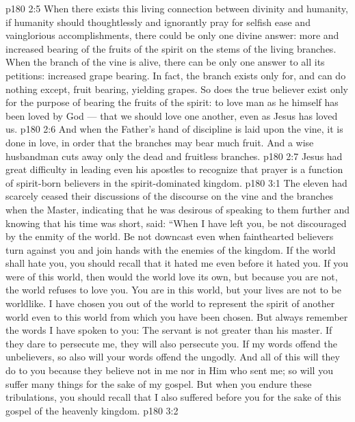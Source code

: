 \vs p180 2:5 When there exists this living connection between divinity and humanity, if humanity should thoughtlessly and ignorantly pray for selfish ease and vainglorious accomplishments, there could be only one divine answer: more and increased bearing of the fruits of the spirit on the stems of the living branches. When the branch of the vine is alive, there can be only one answer to all its petitions: increased grape bearing. In fact, the branch exists only for, and can do nothing except, fruit bearing, yielding grapes. So does the true believer exist only for the purpose of bearing the fruits of the spirit: to love man as he himself has been loved by God --- that we should love one another, even as Jesus has loved us.
\vs p180 2:6 And when the Father’s hand of discipline is laid upon the vine, it is done in love, in order that the branches may bear much fruit. And a wise husbandman cuts away only the dead and fruitless branches.
\vs p180 2:7 Jesus had great difficulty in leading even his apostles to recognize that prayer is a function of spirit\hyp{}born believers in the spirit\hyp{}dominated kingdom.
\vs p180 3:1 The eleven had scarcely ceased their discussions of the discourse on the vine and the branches when the Master, indicating that he was desirous of speaking to them further and knowing that his time was short, said: “When I have left you, be not discouraged by the enmity of the world. Be not downcast even when fainthearted believers turn against you and join hands with the enemies of the kingdom. If the world shall hate you, you should recall that it hated me even before it hated you. If you were of this world, then would the world love its own, but because you are not, the world refuses to love you. You are in this world, but your lives are not to be worldlike. I have chosen you out of the world to represent the spirit of another world even to this world from which you have been chosen. But always remember the words I have spoken to you: The servant is not greater than his master. If they dare to persecute me, they will also persecute you. If my words offend the unbelievers, so also will your words offend the ungodly. And all of this will they do to you because they believe not in me nor in Him who sent me; so will you suffer many things for the sake of my gospel. But when you endure these tribulations, you should recall that I also suffered before you for the sake of this gospel of the heavenly kingdom.
\vs p180 3:2 

